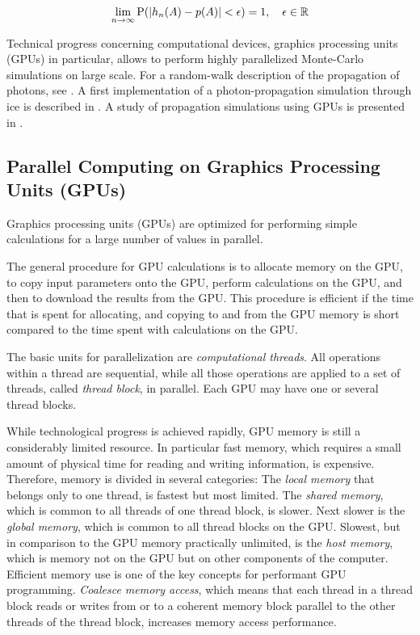 \[
  \lim_{n \rightarrow \infty} \text{P}(|h_n(A) - p(A)| < \epsilon) = 1, \ \ \ \epsilon \in \mathbb{R}
\]

Technical progress concerning computational devices, graphics processing
units (GPUs) in particular, allows to perform highly parallelized
Monte-Carlo simulations on large scale. For a random-walk description of
the propagation of photons, see \cite{absorption1997}. A first
implementation of a photon-propagation simulation through ice is
described in \cite{lundberg}. A study of propagation simulations using
GPUs is presented in \cite{ppcpaper}.

\subsection{Parallel Computing on Graphics Processing Units (GPUs)}
\label{sec:parallel_computing}

Graphics processing units (GPUs) are optimized for performing simple
calculations for a large number of values in parallel.

The general procedure for GPU calculations is to allocate memory on the
GPU, to copy input parameters onto the GPU, perform calculations on the
GPU, and then to download the results from the GPU. This procedure is
efficient if the time that is spent for allocating, and copying to and
from the GPU memory is short compared to the time spent with
calculations on the GPU. \cite{cudacourse}

The basic units for parallelization are \textit{computational threads}.
All operations within a thread are sequential, while all those
operations are applied to a set of threads, called
\textit{thread block}, in parallel. Each GPU may have one or several
thread blocks. \cite{cudacourse}

While technological progress is achieved rapidly, GPU memory is still a
considerably limited resource. In particular fast memory, which requires
a small amount of physical time for reading and writing information, is
expensive. Therefore, memory is divided in several categories: The
\textit{local memory} that belongs only to one thread, is fastest but
most limited. The \textit{shared memory}, which is common to all threads
of one thread block, is slower. Next slower is the
\textit{global memory}, which is common to all thread blocks on the GPU.
Slowest, but in comparison to the GPU memory practically unlimited, is
the \textit{host memory}, which is memory not on the GPU but on other
components of the computer. Efficient memory use is one of the key
concepts for performant GPU programming.
\textit{Coalesce memory access}, which means that each thread in a
thread block reads or writes from or to a coherent memory block parallel
to the other threads of the thread block, increases memory access
performance. \cite{cudacourse}

